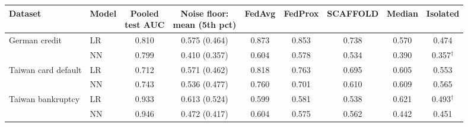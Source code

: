 \begin{tabular}{llccccccc}
\toprule
Dataset & Model & \makecell{Pooled\\test AUC} & \makecell{Noise floor:\\mean (5th pct)} & FedAvg & FedProx & SCAFFOLD & Median & Isolated \\
\midrule
German credit & LR & 0.810 & 0.575 (0.464) & 0.873 & 0.853 & 0.738 & 0.570 & 0.474 \\
 & NN & 0.799 & 0.410 (0.357) & 0.604 & 0.578 & 0.534 & 0.390 & 0.357$^\dagger$ \\
\midrule
Taiwan card default & LR & 0.712 & 0.571 (0.462) & 0.818 & 0.763 & 0.695 & 0.605 & 0.553 \\
 & NN & 0.743 & 0.536 (0.477) & 0.760 & 0.701 & 0.610 & 0.609 & 0.565 \\
\midrule
Taiwan bankruptcy & LR & 0.933 & 0.613 (0.524) & 0.599 & 0.581 & 0.538 & 0.621 & 0.493$^\dagger$ \\
 & NN & 0.946 & 0.472 (0.417) & 0.604 & 0.575 & 0.562 & 0.442 & 0.451 \\
\bottomrule
\end{tabular}
